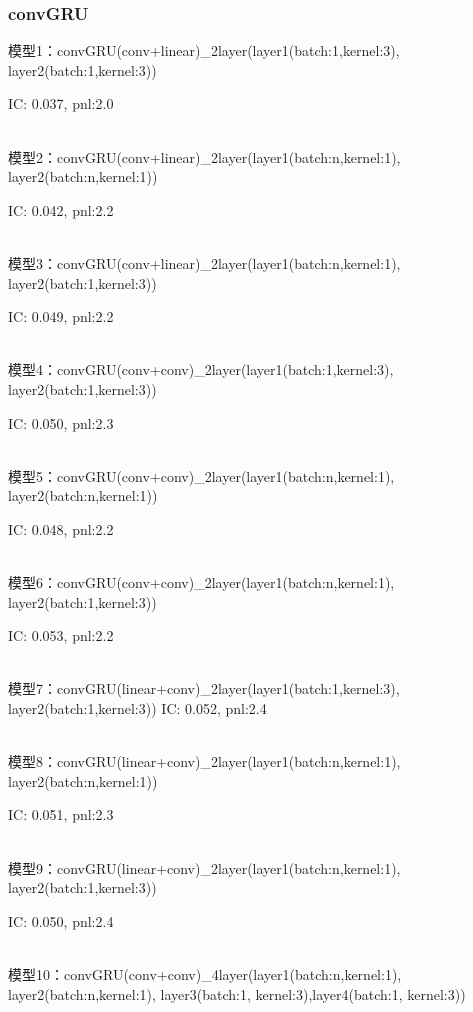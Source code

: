 \documentclass[11pt]{ctexart}
\begin{document}
\subsubsection{convGRU}

模型1：convGRU(conv+linear)\_2layer(layer1(batch:1,kernel:3), layer2(batch:1,kernel:3)) 

{\kaishu \small IC: 0.037, pnl:2.0}

~\\
模型2：convGRU(conv+linear)\_2layer(layer1(batch:n,kernel:1), layer2(batch:n,kernel:1)) 

{\kaishu \small IC: 0.042, pnl:2.2}

~\\
模型3：convGRU(conv+linear)\_2layer(layer1(batch:n,kernel:1), layer2(batch:1,kernel:3)) 

{\kaishu \small IC: 0.049, pnl:2.2}


~\\
模型4：convGRU(conv+conv)\_2layer(layer1(batch:1,kernel:3), layer2(batch:1,kernel:3)) 

{\kaishu \small IC: 0.050, pnl:2.3}

~\\
模型5：convGRU(conv+conv)\_2layer(layer1(batch:n,kernel:1), layer2(batch:n,kernel:1)) 

{\kaishu \small IC: 0.048, pnl:2.2}

~\\
模型6：convGRU(conv+conv)\_2layer(layer1(batch:n,kernel:1), layer2(batch:1,kernel:3)) 

{\kaishu \small IC: 0.053, pnl:2.2}


~\\
模型7：convGRU(linear+conv)\_2layer(layer1(batch:1,kernel:3), layer2(batch:1,kernel:3)) 
{\kaishu \small IC: 0.052, pnl:2.4}

~\\
模型8：convGRU(linear+conv)\_2layer(layer1(batch:n,kernel:1), layer2(batch:n,kernel:1)) 

{\kaishu \small IC: 0.051, pnl:2.3}

~\\
模型9：convGRU(linear+conv)\_2layer(layer1(batch:n,kernel:1), layer2(batch:1,kernel:3)) 

{\kaishu \small IC: 0.050, pnl:2.4}

~\\
模型10：convGRU(conv+conv)\_4layer(layer1(batch:n,kernel:1), layer2(batch:n,kernel:1), layer3(batch:1, kernel:3),layer4(batch:1, kernel:3)) 
\end{document}
